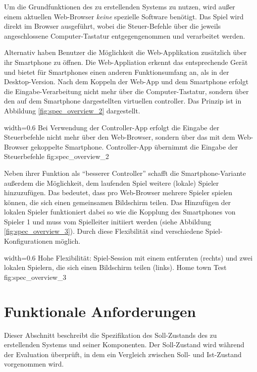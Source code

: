Um die Grundfunktionen des zu erstellenden Systems zu nutzen, wird außer
einem aktuellen Web-Browser \emph{keine} spezielle Software benötigt.
Das Spiel wird direkt im Browser ausgeführt, wobei die Steuer-Befehle
über die jeweils angeschlossene Computer-Tastatur entgegengenommen und
verarbeitet werden.

Alternativ haben Benutzer die Möglichkeit die Web-Applikation zusätzlich
über ihr Smartphone zu öffnen. Die Web-Appliation erkennt das
entsprechende Gerät und bietet für Smartphones einen anderen
Funktionsumfang an, als in der Desktop-Version. Nach dem Koppeln der
Web-App und dem Smartphone erfolgt die Eingabe-Verarbeitung nicht mehr
über die Computer-Tastatur, sondern über den auf dem Smartphone
dargestellten virtuellen \gls{controller}. Das Prinzip ist in Abbildung
\ref{fig:spec_overview_2} dargestellt.

   {width=0.6\textwidth}
   {Bei Verwendung der Controller-App erfolgt die Eingabe der Steuerbefehle nicht mehr über den Web-Browser, sondern über das mit dem Web-Browser gekoppelte Smartphone.}
   {Controller-App übernimmt die Eingabe der Steuerbefehle}
   {fig:spec_overview_2}

Neben ihrer Funktion als ``besserer Controller'' schafft die
Smartphone-Variante außerdem die Möglichkeit, dem laufenden Spiel
weitere (lokale) Spieler hinzuzufügen. Das bedeutet, dass pro
Web-Browser mehrere Spieler spielen können, die sich einen gemeinsamen
Bildschirm teilen. Das Hinzufügen der lokalen Spieler funktioniert dabei
so wie die Kopplung des Smartphones von Spieler 1 und muss vom
Spielleiter initiiert werden (siehe Abbildung
\ref{fig:spec_overview_3}). Durch diese Flexibilität sind verschiedene
Spiel-Konfigurationen möglich.

   {width=0.6\textwidth}
   {Hohe Flexibilität: Spiel-Session mit einem entfernten (rechts) und zwei lokalen Spielern, die sich einen Bildschirm teilen (links).}
   {Home town Test}
   {fig:spec_overview_3}

\section{Funktionale Anforderungen}\label{funktionale-anforderungen}

Dieser Abschnitt beschreibt die Spezifikation des Soll-Zustands des zu
erstellenden Systems und seiner Komponenten. Der Soll-Zustand wird
während der Evaluation überprüft, in dem ein Vergleich zwischen Soll-
und Ist-Zustand vorgenommen wird.

